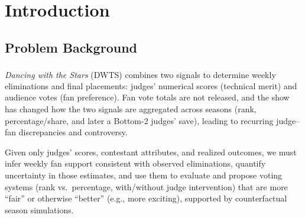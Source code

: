 \documentclass[12pt]{article}
\begin{document}
\begin{abstract}
		\noindent \textbf{In task 4, 
			alternative elimination rules are designed and evaluated} to balance fairness and excitement under unobserved fan votes. Using \textbf{Monte Carlo season replays} driven by posterior fan-share draws, we compare format such as Entertainment-First Scheme (V1) and Fairness-Adjusted Blend (V2) with base model. As a result, V1 yields limited correction of popularity-driven runs, while V2 markedly reduces technical shocks without killing suspense, \textbf{motivating a V1-early/V2-late hybrid as the preferred policy}.
		
		\noindent Finally, based on our research findings, we provided the organizing committee with concrete, actionable recommendations: optimizing the casting matrix and restructuring voting weights.
		
		
		\medskip
		\noindent \textbf{Keywords}:\quad Bayesian Inference \quad Monte-Carlo Simulation 
		\quad Surprise Index \quad Retrospective Inference  \quad DWTS 
		
		
	\end{abstract}
	
	\maketitle  %
	
	\tableofcontents
	


\section{Introduction}

\subsection{Problem Background}

\emph{Dancing with the Stars} (DWTS)   \textsuperscript{\cite{dwts_wiki}} combines two signals to determine weekly eliminations and final placements: judges’ numerical scores (technical merit) and audience votes (fan preference). Fan vote totals are not released, and the show has changed how the two signals are aggregated across seasons (rank, percentage/share, and later a Bottom-2 judges’ save), leading to recurring judge--fan discrepancies and controversy.

Given only judges’ scores, contestant attributes, and realized outcomes, we must infer weekly fan support consistent with observed eliminations, quantify uncertainty in those estimates, and use them to evaluate and propose voting systems (rank vs.\ percentage, with/without judge intervention) that are more ``fair'' or otherwise ``better'' (e.g., more exciting), supported by counterfactual season simulations.
\end{document}
